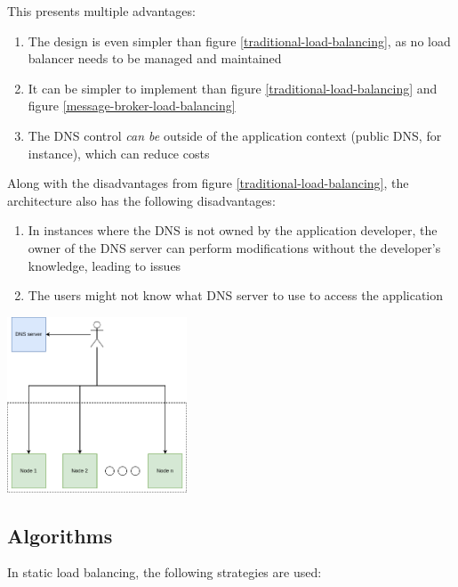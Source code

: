 \documentclass[conference]{IEEEtran}
\begin{document}
    This presents multiple advantages:

    \begin{enumerate}
        \item The design is even simpler than figure \ref{traditional-load-balancing}, as no load balancer needs to be managed and
        maintained
        \item It can be simpler to implement than figure \ref{traditional-load-balancing} and figure \ref{message-broker-load-balancing}
        \item The DNS control \textit{can be} outside of the application context (public DNS, for instance), which can reduce
        costs
    \end{enumerate}

    Along with the disadvantages from figure \ref{traditional-load-balancing}, the architecture also has the following disadvantages:

    \begin{enumerate}
        \item In instances where the DNS is not owned by the application developer, the owner of the DNS server can perform
        modifications without the developer's knowledge, leading to issues
        \item The users might not know what DNS server to use to access the application
    \end{enumerate}

    \begin{center}
        \vspace{1em}
        \includegraphics[width=0.4\textwidth]{dns-load-balancing.png}
         \label{dns-load-balancing}
        \vspace{1em}
    \end{center}

\subsection{Algorithms}
    In static load balancing, the following strategies are used:
\end{document}
